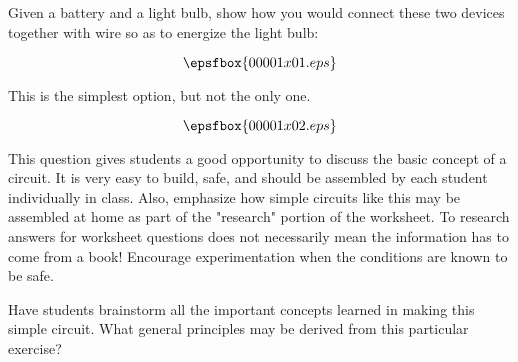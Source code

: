 

Given a battery and a light bulb, show how you would connect these two devices together with wire so as to energize the light bulb:

$$\epsfbox{00001x01.eps}$$ 







This is the simplest option, but not the only one.

$$\epsfbox{00001x02.eps}$$ 







This question gives students a good opportunity to discuss the basic concept of a circuit.  It is very easy to build, safe, and should be assembled by each student individually in class.  Also, emphasize how simple circuits like this may be assembled at home as part of the "research" portion of the worksheet.  To research answers for worksheet questions does not necessarily mean the information has to come from a book!  Encourage experimentation when the conditions are known to be safe.

Have students brainstorm all the important concepts learned in making this simple circuit.  What general principles may be derived from this particular exercise?




